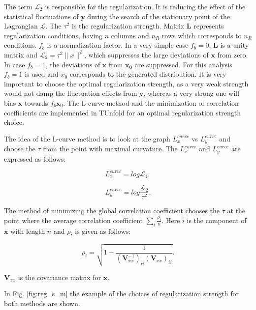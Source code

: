 The term $\mathcal{L}_{2}$ is responsible for the regularization. It is reducing the effect of the statistical fluctuations of $\mathbf{y}$
during the search of the stationary point of the Lagrangian $\mathcal{L}$. The $\tau^{2}$ is the regularization strength. Matrix $\mathbf{L}$
represents regularization conditions, having $n$ columns and $n_{R}$ rows which corresponds to $n_{R}$ conditions. $f_{b}$ is a normalization 
factor. In a very simple case $f_{b} = 0$, $\mathbf{L}$ is a unity matrix and $\mathcal{L}_{2} = \tau^{2} \parallel x \parallel^{2}$, which
suppresses the large deviations of $\mathbf{x}$ from zero. In case $f_{b} = 1$, the deviations of $\mathbf{x}$ from $\mathbf{x_{0}}$ are
suppressed. For this analysis $f_{b} = 1$ is used and $x_{0}$ corresponds to the generated distribution. It is very important to choose 
the optimal regularization strength, as a very weak strength would not damp the fluctuation effects from $\mathbf{y}$, whereas a very strong 
one will bias $\mathbf{x}$ towards $f_{b}\mathbf{x}_{0}$. The L-curve method \cite{Hansen00thel-curve} and the minimization
of correlation coefficients \cite{VBlobelT} are implemented in TUnfold for an optimal regularization strength choice. 

The idea of the L-curve method is to look at the graph $L_{x}^{curve}$ vs $L_{y}^{curve}$ and choose the $\tau$ from the point with
maximal curvature. The $L_{x}^{curve}$ and $L_{y}^{curve}$ are expressed as follows:

\begin{equation}
 L_{x}^{curve} = log \mathcal{L}_{1},
\end{equation}

\begin{equation}
 L_{y}^{curve} = log \frac{\mathcal{L}_{2}}{\tau^{2}}.
\end{equation}

The method of minimizing the global correlation coefficient chooses the $\tau$ at the point where the average correlation coefficient 
$\sum_{i} \frac{\rho_{i}}{n}$. Here $i$ is the component of $\mathbf{x}$ with length $n$ and $\rho_{i}$ is given as follows:\

\begin{equation}
 \rho_{i} = \sqrt{1 - \frac{1}{(\mathbf{V}_{xx}^{-1})_{ii} (\mathbf{V}_{xx})_{ii}}}.
\end{equation}

$\mathbf{V}_{xx}$ is the covariance matrix for $\mathbf{x}$.

In Fig. \ref{fig:reg_s_m} the example of the choices of regularization strength for both methods are shown.

